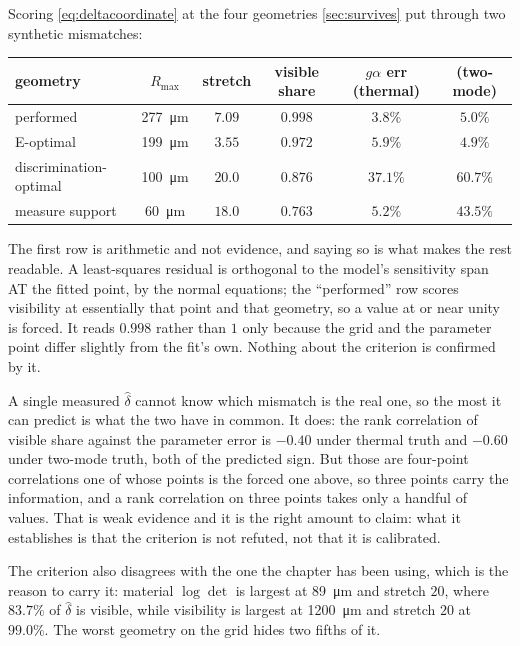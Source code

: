 \documentclass[10pt]{article}
\begin{document}
Scoring \eqref{eq:deltacoordinate} at the four geometries \cref{sec:survives} put through two
synthetic mismatches:

\begin{center}
\begin{tabular}{lccccc}
\toprule
geometry & $R_{\max}$ & stretch & visible share & $g\alpha$ err (thermal) & (two-mode) \\
\midrule
performed & \SI{277}{\micro\metre} & $7.09$ & $\mathbf{0.998}$ & $3.8\%$ & $5.0\%$ \\
E-optimal & \SI{199}{\micro\metre} & $3.55$ & $0.972$ & $5.9\%$ & $4.9\%$ \\
discrimination-optimal & \SI{100}{\micro\metre} & $20.0$ & $0.876$ & $\mathbf{37.1\%}$ & $\mathbf{60.7\%}$ \\
measure support & \SI{60}{\micro\metre} & $18.0$ & $\mathbf{0.763}$ & $5.2\%$ & $43.5\%$ \\
\bottomrule
\end{tabular}
\end{center}

\noindent The first row is arithmetic and not evidence, and saying so is what makes the rest
readable. A least-squares residual is orthogonal to the model's sensitivity span AT the fitted
point, by the normal equations; the ``performed'' row scores visibility at essentially that
point and that geometry, so a value at or near unity is forced. It reads $0.998$ rather than
$1$ only because the grid and the parameter point differ slightly from the fit's own. Nothing
about the criterion is confirmed by it.

A single measured $\hat\delta$ cannot know which mismatch is the real one, so the most
it can predict is what the two have in common. It does: the rank correlation of visible share
against the parameter error is $-0.40$ under thermal truth and $-0.60$ under two-mode truth,
both of the predicted sign. But those are four-point correlations one of whose points is the
forced one above, so three points carry the information, and a rank correlation on three points
takes only a handful of values. That is weak evidence and it is the right amount to claim: what
it establishes is that the criterion is not refuted, not that it is calibrated.

The criterion also disagrees with the one the chapter has been using, which is the reason to
carry it: material $\log\det$ is largest at \SI{89}{\micro\metre} and stretch $20$, where
$83.7\%$ of $\hat\delta$ is visible, while visibility is largest at \SI{1200}{\micro\metre} and
stretch $20$ at $99.0\%$. The worst geometry on the grid hides two fifths of it.
\end{document}
